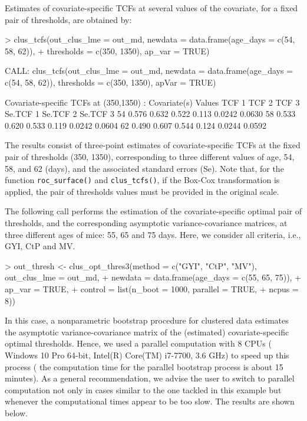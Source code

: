 Estimates of covariate-specific TCFs at several values of the covariate, for a fixed pair of thresholds, are obtained by:
{
\begin{example}
> clus_tcfs(out_clus_lme = out_md, newdata = data.frame(age_days = c(54, 58, 62)), 
+           thresholds = c(350, 1350), ap_var = TRUE)

CALL: clus_tcfs(out_clus_lme = out_md, newdata = data.frame(age_days = c(54, 
    58, 62)), thresholds = c(350, 1350), apVar = TRUE)
 
Covariate-specific TCFs at (350,1350) : 
 Covariate(s) Values TCF 1 TCF 2 TCF 3 Se.TCF 1 Se.TCF 2 Se.TCF 3
                  54 0.576 0.632 0.522    0.113   0.0242   0.0630
                  58 0.533 0.620 0.533    0.119   0.0242   0.0604
                  62 0.490 0.607 0.544    0.124   0.0244   0.0592
\end{example}
}
\noindent
The results consist of three-point estimates of covariate-specific TCFs at the fixed pair of thresholds (350, 1350), corresponding to three different values of age, 54, 58, and 62 (days), and the associated standard errors (Se). Note that, for the function \texttt{roc\_surface()} and \texttt{clus\_tcfs()}, if the Box-Cox transformation is applied, the pair of thresholds values must be provided in the original scale.

The following call performs the estimation of the covariate-specific optimal pair of thresholds, and the corresponding asymptotic variance-covariance matrices, at three different ages of mice: 55, 65 and 75 days. Here, we consider all criteria, i.e., GYI, CtP and MV.

\begin{example}
> out_thresh <- clus_opt_thres3(method = c("GYI", "CtP", "MV"), out_clus_lme = out_md,
+                               newdata = data.frame(age_days = c(55, 65, 75)),
+                               ap_var = TRUE,
+                               control = list(n_boot = 1000, parallel = TRUE, 
+                                              ncpus = 8))
\end{example}

\noindent
In this case, a nonparametric bootstrap procedure for clustered data estimates the asymptotic variance-covariance matrix of the (estimated) covariate-specific optimal thresholds. Hence, we used a parallel computation with 8 CPUs ( Windows 10 Pro 64-bit, Intel(R) Core(TM) i7-7700, 3.6 GHz) to speed up this process ( the computation time for the parallel bootstrap process is about 15 minutes). As a general recommendation, we advise the user to switch to parallel computation not only in cases similar to the one tackled in this example but whenever the computational times appear to be too slow. The results are shown below.

